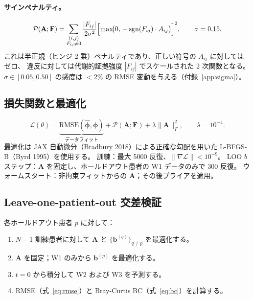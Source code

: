 \documentclass[11pt,a4paper]{article}
\newcommand{\bphi}{\boldsymbol{\phi}}
\newcommand{\bA}{\mathbf{A}}
\newcommand{\bF}{\mathbf{F}}
\newcommand{\bb}{\mathbf{b}}
\newcommand{\sgn}{\operatorname{sgn}}
\newcommand{\calP}{\mathcal{P}}
\newcommand{\calL}{\mathcal{L}}
\begin{document}
\paragraph{サインペナルティ。}
\begin{equation}
  \calP(\bA;\bF)
  = \sum_{\substack{(i,j)\\F_{ij}\neq 0}}
    \frac{|F_{ij}|}{2\sigma^2}
    \Bigl[\max\!\bigl(0,\,-\sgn(F_{ij})\cdot A_{ij}\bigr)\Bigr]^2,
  \qquad \sigma = 0.15.
  \label{eq:penalty}
\end{equation}
これは半正規（ヒンジ 2 乗）ペナルティであり、正しい符号の $A_{ij}$ に対してはゼロ、
違反に対しては代謝的証拠強度 $|F_{ij}|$ でスケールされた 2 次関数となる。
$\sigma\in[0.05,0.50]$ の感度は $< 2\%$ の RMSE 変動を与える（付録~\ref{app:sigma}）。

\subsection{損失関数と最適化}
\label{ssec:optim}

\begin{equation}
  \calL(\theta)
  = \underbrace{\text{RMSE}(\hat{\bphi},\bphi)}_{\text{データフィット}}
  + \calP(\bA;\bF)
  + \lambda\|\bA\|_F^2,
  \qquad \lambda=10^{-4}.
  \label{eq:loss}
\end{equation}
最適化は JAX 自動微分（Bradbury 2018）による正確な勾配を用いた
L-BFGS-B（Byrd 1995）を使用する。
訓練：最大 5000 反復、$\|\nabla\calL\|<10^{-9}$。
LOO $b$ ステップ：$\bA$ を固定し、ホールドアウト患者の W1 データのみで 300 反復。
ウォームスタート：非拘束フィットからの $\bA$；その後プライアを適用。

\subsection{Leave-one-patient-out 交差検証}
\label{ssec:loo}

各ホールドアウト患者 $p$ に対して：
\begin{enumerate}[noitemsep]
  \item $N-1$ 訓練患者に対して $\bA$ と $\{\bb^{(q)}\}_{q\neq p}$ を最適化する。
  \item $\bA$ を固定；W1 のみから $\bb^{(p)}$ を最適化する。
  \item $t=0$ から積分して W2 および W3 を予測する。
  \item RMSE（式~\ref{eq:rmse}）と Bray-Curtis BC（式~\ref{eq:bc}）を計算する。
\end{enumerate}
\end{document}

